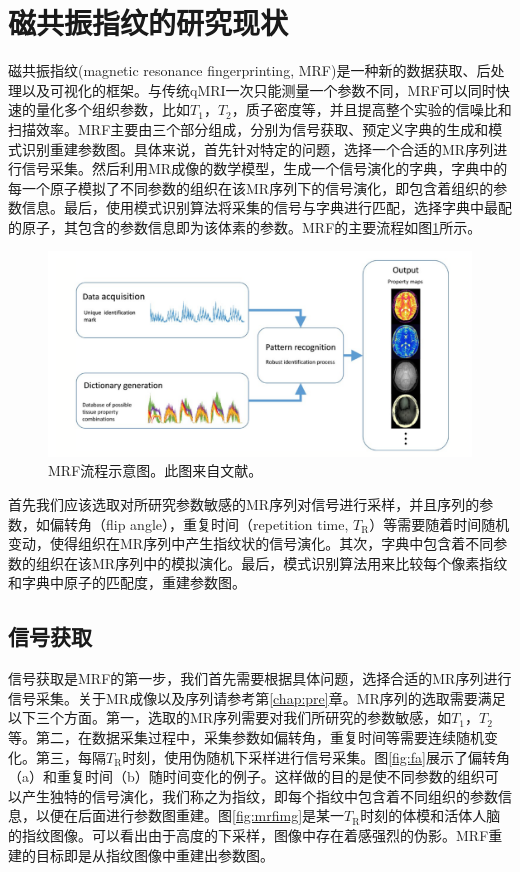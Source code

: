 \section{磁共振指纹的研究现状}
\label{sec:mrf}
磁共振指纹(magnetic resonance fingerprinting, MRF)是一种新的数据获取、后处理以及可视化的框架。与传统qMRI一次只能测量一个参数不同，MRF可以同时快速的量化多个组织参数，比如$T_1$，$T_2$，质子密度等，并且提高整个实验的信噪比和扫描效率。MRF主要由三个部分组成，分别为信号获取、预定义字典的生成和模式识别重建参数图。具体来说，首先针对特定的问题，选择一个合适的MR序列进行信号采集。然后利用MR成像的数学模型，生成一个信号演化的字典，字典中的每一个原子模拟了不同参数的组织在该MR序列下的信号演化，即包含着组织的参数信息。最后，使用模式识别算法将采集的信号与字典进行匹配，选择字典中最配的原子，其包含的参数信息即为该体素的参数。MRF的主要流程如图\ref{fig:mrf}所示。
\begin{figure}[htbp]
\centerline{\includegraphics[width=1\textwidth]{img/intro/mrf.png}}
\caption{
MRF流程示意图。此图来自文献\cite{mrfreview}。
}
\label{fig:mrf}
\end{figure}

首先我们应该选取对所研究参数敏感的MR序列对信号进行采样，并且序列的参数，如偏转角（flip angle），重复时间（repetition time, $T_\mathrm{R}$）等需要随着时间随机变动，使得组织在MR序列中产生指纹状的信号演化。其次，字典中包含着不同参数的组织在该MR序列中的模拟演化。最后，模式识别算法用来比较每个像素指纹和字典中原子的匹配度，重建参数图。

\subsection{信号获取}
信号获取是MRF的第一步，我们首先需要根据具体问题，选择合适的MR序列进行信号采集。关于MR成像以及序列请参考第\ref{chap:pre}章。MR序列的选取需要满足以下三个方面。第一，选取的MR序列需要对我们所研究的参数敏感，如$T_1$，$T_2$等。第二，在数据采集过程中，采集参数如偏转角，重复时间等需要连续随机变化。第三，每隔$T_\mathrm{R}$时刻，使用伪随机下采样进行信号采集。图\ref{fig:fa}展示了偏转角（a）和重复时间（b）随时间变化的例子。这样做的目的是使不同参数的组织可以产生独特的信号演化，我们称之为指纹，即每个指纹中包含着不同组织的参数信息，以便在后面进行参数图重建。图\ref{fig:mrfimg}是某一$T_\mathrm{R}$时刻的体模和活体人脑的指纹图像。可以看出由于高度的下采样，图像中存在着感强烈的伪影。MRF重建的目标即是从指纹图像中重建出参数图。

